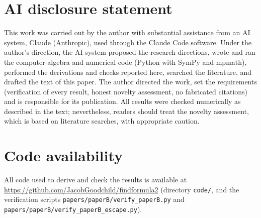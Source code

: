 \documentclass[11pt,a4paper]{article}
\theoremstyle{remark}
\numberwithin{equation}{section}
\begin{document}
\section*{AI disclosure statement}
This work was carried out by the author with substantial assistance from an AI system, Claude
(Anthropic), used through the Claude Code software. Under the author's direction, the AI system
proposed the research directions, wrote and ran the computer-algebra and numerical code (Python
with SymPy and mpmath), performed the derivations and checks reported here, searched the
literature, and drafted the text of this paper. The author directed the work, set the requirements
(verification of every result, honest novelty assessment, no fabricated citations) and is
responsible for its publication. All results were checked numerically as described in the text;
nevertheless, readers should treat the novelty assessment, which is based on literature searches,
with appropriate caution.

\begin{sloppypar}
\section*{Code availability}
All code used to derive and check the results is available at
\url{https://github.com/JacobGoodchild/findformula2} (directory \texttt{code/}, and the
verification scripts \texttt{papers/paperB/verify\_paperB.py} and \texttt{papers/paperB/verify\_paperB\_escape.py}).
\end{sloppypar}
\end{document}
